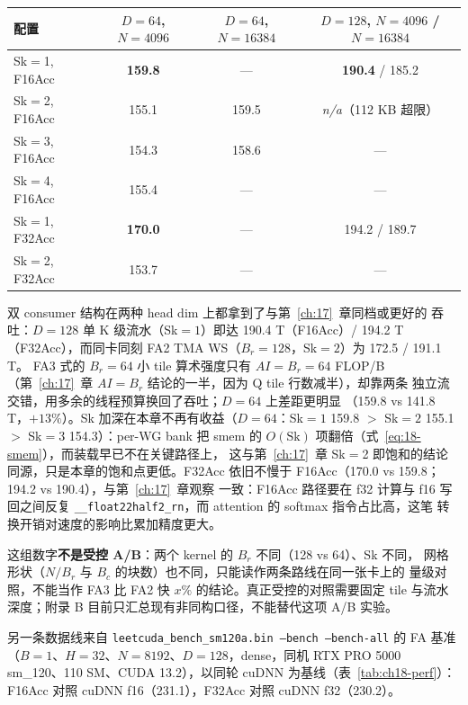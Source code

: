 \begin{center}
\begin{tabular}{lccc}
\toprule
配置 & $D{=}64$, $N{=}4096$ & $D{=}64$, $N{=}16384$ & $D{=}128$, $N{=}4096$ / $N{=}16384$ \\
\midrule
Sk$=$1, F16Acc & \textbf{159.8} & — & \textbf{190.4} / 185.2 \\
Sk$=$2, F16Acc & 155.1 & 159.5 & \emph{n/a}（112 KB 超限）\\
Sk$=$3, F16Acc & 154.3 & 158.6 & — \\
Sk$=$4, F16Acc & 155.4 & — & — \\
Sk$=$1, F32Acc & \textbf{170.0} & — & 194.2 / 189.7 \\
Sk$=$2, F32Acc & 153.7 & — & — \\
\bottomrule
\end{tabular}
\end{center}

双 consumer 结构在两种 head dim 上都拿到了与第~\ref{ch:17}~章同档或更好的
吞吐：$D{=}128$ 单 K 级流水（Sk$=1$）即达 190.4 T（F16Acc）/ 194.2 T
（F32Acc），而同卡同刻 FA2 TMA WS（$B_r{=}128$，Sk$=2$）为 172.5 / 191.1 T。
FA3 式的 $B_r{=}64$ 小 tile 算术强度只有 $AI = B_r = 64$ FLOP/B
（第~\ref{ch:17}~章 $AI = B_r$ 结论的一半，因为 Q tile 行数减半），却靠两条
独立流交错，用多余的线程预算换回了吞吐；$D{=}64$ 上差距更明显
（159.8 vs 141.8 T，$+13\%$）。Sk 加深在本章不再有收益（$D{=}64$：Sk$=1$
159.8 $>$ Sk$=2$ 155.1 $>$ Sk$=3$ 154.3）：per-WG bank 把 smem 的
$O(\mathrm{Sk})$ 项翻倍（式~\ref{eq:18-smem}），而装载早已不在关键路径上，
这与第~\ref{ch:17}~章 Sk$=$2 即饱和的结论同源，只是本章的饱和点更低。F32Acc
依旧不慢于 F16Acc（170.0 vs 159.8；194.2 vs 190.4），与第~\ref{ch:17}~章观察
一致：F16Acc 路径要在 f32 计算与 f16 写回之间反复
\texttt{\_\allowbreak{}\_\allowbreak{}float22half2\_\allowbreak{}rn}，而 attention 的 softmax 指令占比高，这笔
转换开销对速度的影响比累加精度更大。

这组数字\textbf{不是受控 A/B}：两个 kernel 的 $B_r$ 不同（128 vs 64）、Sk 不同，
网格形状（$N/B_r$ 与 $B_c$ 的块数）也不同，只能读作两条路线在同一张卡上的
量级对照，不能当作 FA3 比 FA2 快 $x\%$ 的结论。真正受控的对照需要固定 tile
与流水深度；附录 B 目前只汇总现有非同构口径，不能替代这项 A/B 实验。

另一条数据线来自 \texttt{leetcuda\_\allowbreak{}bench\_\allowbreak{}sm120a.bin --bench --bench-all} 的
FA 基准（$B{=}1$、$H{=}32$、$N{=}8192$、$D{=}128$，dense，同机 RTX PRO 5000
sm\_120、110 SM、CUDA 13.2），以同轮 cuDNN 为基线（表~\ref{tab:ch18-perf}）：
F16Acc 对照 cuDNN f16（231.1），F32Acc 对照 cuDNN f32（230.2）。

